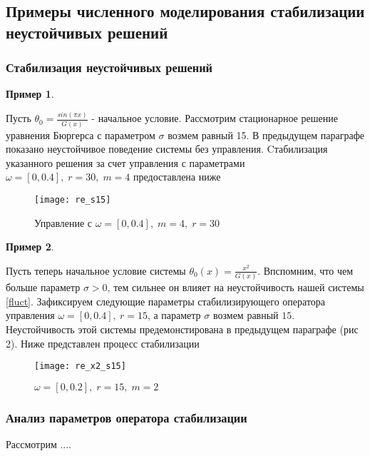 \subsection{Примеры численного моделирования стабилизации неустойчивых решений}
\vspace{1em}

\subsubsection{Стабилизация неустойчивых решений}

\newtheorem{exmp_stbur}{Пример}

\begin{exmp_stbur}
\end{exmp_stbur}

Пусть $\theta_0 = \frac{sin(\pi x)}{G(x)}$ - начальное условие. Рассмотрим
стационарное решение уравнения Бюргерса с параметром $\sigma$ возмем равный 15. 
В предыдущем параграфе показано неустойчивое поведение системы без управления. 
Cтабилизация указанного решения за счет управления с параметрами 
$\omega = [0, 0.4], \; r = 30, \; m = 4$ предоставлена ниже


\begin{figure}[H]
  \centering
  \texttt{[image: re\_s15]}
  \caption{Управление с $\omega = [0, 0.4], \; m = 4, \; r = 30$}
  \label{fig:test2}
\end{figure}


\begin{exmp_stbur}
\end{exmp_stbur}
Пусть теперь начальное условие системы $\theta_0(x) = \frac{x^2}{G(x)}$.
Впспомним, что чем больше параметр $\sigma > 0$, тем сильнее он влияет на
неустойчивость нашей системы \eqref{fluct}. Зафиксируем следующие параметры
стабилизирующего оператора управления $\omega = [0, 0.4], \ r = 15$, а параметр 
$\sigma$  возмем равный $15$. Неустойчивость этой системы предемонстирована в
предыдущем параграфе (рис 2). Ниже представлен процесс стабилизации

\begin{figure}[H]
 \centering
  \texttt{[image: re\_x2\_s15]}
  \caption{$\omega = [0, 0.2], \; r = 15, \; m = 2$}
  \label{fig:test2}
\end{figure}

\subsubsection{Анализ параметров оператора стабилизации}

Рассмотрим ....

